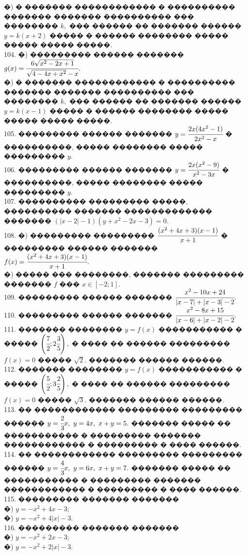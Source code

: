\documentclass[12pt]{article}
\begin{document}
�) � ������� ������������ � ���������� ������� ������� ���������� ��� �������� $k,$ ��� ������ �� ������� ������ $y=k(x+2)$ ����� � ������ �������� ����� ����� ����� �����.\\
104. �) ��������� ������ ������� $g(x)=\cfrac{6\sqrt{x^2-2x+1}}{\sqrt{4-4x+x^2}-x}.$\\
�) � ������� ������������ � ���������� ������� ������� ���������� ��� �������� $k,$ ��� ������ �� ������� ������ $y=k(x-1)$ ����� � ������ �������� ����� ����� ����� �����.\\
105. ��������� ������ ������� $y=\cfrac{2x(4x^2-1)}{2x^2-x}$ � ����������, ����� �������� ����� ��������� $y.$\\
106. ��������� ������ ������� $y=\cfrac{2x(x^2-9)}{x^2-3x}$ � ����������, ����� �������� ����� ��������� $y.$\\
107. ���������� ��������� �����, ���������� ������� ������������� ������� $(|x-2|-1)(y+x^2-2x-3)=0.$\\
108. �) ��������� ��������� $\cfrac{(x^2+4x+3)(x-1)}{x+1}$ � ��������� ������ ������� \\$f(x)=\cfrac{(x^2+4x+3)(x-1)}{x+1}.$\\
�) ����� ��� ��������, ������� ��������� ������� $f$ ��� $x\in[-2;1].$\\
109. ��������� ������ ������� $\cfrac{x^2-10x+24}{|x-7|+|x-3|-2}.$\\
110. ��������� ������ ������� $\cfrac{x^2-8x+15}{|x-6|+|x-2|-2}.$\\
111. ������� �������� $y=f(x)$ ����������� � ����� $\left(\cfrac{7}{2};2\cfrac{3}{5}\right),$ � ���� �� ������ ��������� $f(x)=0$
����� $\sqrt{2}.$ ������� ������ ������.\\
112. ������� �������� $y=f(x)$ ����������� � ����� $\left(\cfrac{5}{2};3\cfrac{2}{5}\right),$ � ���� �� ������ ��������� $f(x)=0$
����� $\sqrt{3}.$ ������� ������ ������.\\
113. �� ������������ ��������� ��������� ������ $y=\cfrac{2}{3}x,\ y=4x,\ x+y=5.$ ������� ����� �� ����������� � ��������� ������� ������������
� ��������� � ���� ������.\\
114. �� ������������ ��������� ��������� ������ $y=\cfrac{4}{3}x,\ y=6x,\ x+y=7.$ ������� ����� �� ����������� � ��������� ������� ������������
� ��������� � ���� ������.\\
115. ��������� ������� �������\\
�) $y=-x^2+4x-3;$\\
�) $y=-x^2+4|x|-3.$\\
116. ��������� ������� �������\\
�) $y=-x^2+2x-3;$\\
�) $y=-x^2+2|x|-3.$
\newpage
\end{document}
